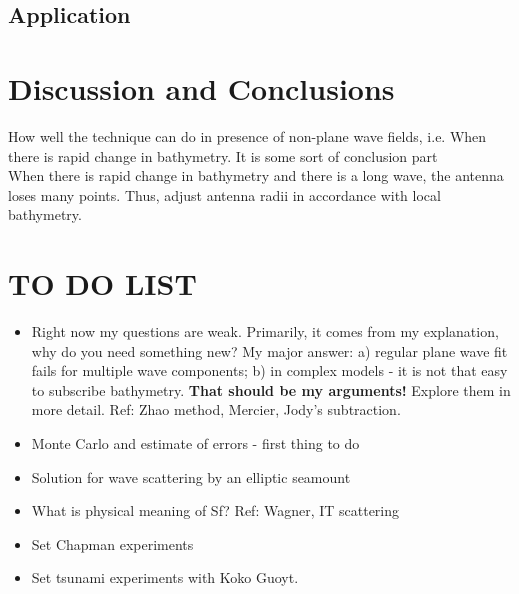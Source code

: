 \subsection{Application}

\section{Discussion and Conclusions}
How well the technique can do in presence of non-plane wave fields, i.e. When there is rapid change in bathymetry. It is some sort of conclusion part\\
When there is rapid change in bathymetry and there is a long wave, the antenna loses many points. Thus, adjust antenna radii in accordance with local bathymetry.




\section{TO DO LIST}
\begin{itemize}
\item Right now my questions are weak. Primarily, it comes from my explanation, why do you need something new? My major answer: a) regular plane wave fit fails for multiple wave components; b) in complex models - it is not that easy to subscribe bathymetry. \textbf{That should be my arguments!} Explore them in more detail. Ref: Zhao method, Mercier, Jody's subtraction.

\item Monte Carlo and estimate of errors - first thing to do

\item Solution for wave scattering by an elliptic seamount

\item What is physical meaning of Sf? Ref: Wagner, IT scattering

\item Set Chapman experiments

\item Set tsunami experiments with Koko Guoyt.
\end{itemize}
